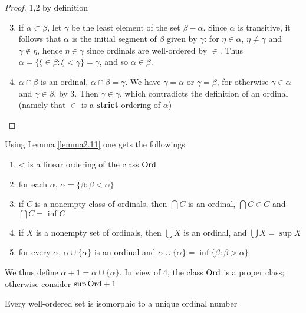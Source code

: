 \documentclass[11pt]{article}
\begin{document}
\begin{proof}
1,2 by definition

\begin{enumerate}
\setcounter{enumi}{2}
\item if \(\alpha\subset\beta\), let \(\gamma\) be the least element of the set \(\beta-\alpha\). Since \(\alpha\) is transitive, it
follows that \(\alpha\) is the initial segment of \(\beta\) given by \(\gamma\): for \(\eta\in\alpha\), \(\eta\neq\gamma\) and \(\gamma\not\in\eta\),
hence \(\eta\in\gamma\) since ordinals are well-ordered by \(\in\). Thus \(\alpha=\{\xi\in\beta:\xi<\gamma\}=\gamma\), and
so \(\alpha\in\beta\).
\item \(\alpha\cap\beta\) is an ordinal, \(\alpha\cap\beta=\gamma\). We have \(\gamma=\alpha\) or \(\gamma=\beta\), for otherwise \(\gamma\in\alpha\)
and \(\gamma\in\beta\), by 3. Then \(\gamma\in\gamma\), which contradicts the definition of an ordinal (namely
that \(\in\) is a \textbf{strict} ordering of \(\alpha\))
\end{enumerate}
\end{proof}

Using Lemma \ref{lemma2.11} one gets the followings
\begin{enumerate}
\item < is a linear ordering of the class \(\text{Ord}\)
\item for each \(\alpha\), \(\alpha=\{\beta:\beta<\alpha\}\) \label{Question1}
\item if \(C\) is a nonempty class of ordinals, then \(\bigcap C\) is an ordinal, \(\bigcap C\in C\)
and \(\bigcap C=\inf C\)
\item if \(X\) is a nonempty set of ordinals, then \(\bigcup X\) is an ordinal, and \(\bigcup X=\sup X\)
\item for every \(\alpha\), \(\alpha\cup\{\alpha\}\) is an ordinal and \(\alpha\cup\{\alpha\}=\inf\{\beta:\beta>\alpha\}\)
\end{enumerate}


We thus define \(\alpha+1=\alpha\cup\{\alpha\}\). In view of 4, the class \(\text{Ord}\) is a proper class; otherwise
consider \(\sup\text{Ord}+1\)

\begin{theorem}[]
Every well-ordered set is isomorphic to a unique ordinal number
\end{theorem}
\end{document}
